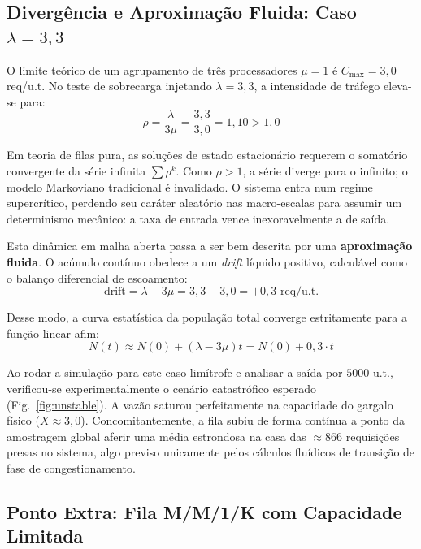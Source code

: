 \documentclass[conference]{IEEEtran}
\begin{document}
\subsection{Divergência e Aproximação Fluida: Caso $\lambda = 3{,}3$}

O limite teórico de um agrupamento de três processadores $\mu=1$ é $C_{\text{max}} = 3{,}0$ req/u.t. No teste de sobrecarga injetando $\lambda = 3{,}3$, a intensidade de tráfego eleva-se para:
\begin{equation}
\rho = \frac{\lambda}{3\mu} = \frac{3{,}3}{3{,}0} = 1{,}10 > 1{,}0
\end{equation}

Em teoria de filas pura, as soluções de estado estacionário requerem o somatório convergente da série infinita $\sum \rho^k$. Como $\rho > 1$, a série diverge para o infinito; o modelo Markoviano tradicional é invalidado. O sistema entra num regime supercrítico, perdendo seu caráter aleatório nas macro-escalas para assumir um determinismo mecânico: a taxa de entrada vence inexoravelmente a de saída.

Esta dinâmica em malha aberta passa a ser bem descrita por uma \textbf{aproximação fluida}. O acúmulo contínuo obedece a um \textit{drift} líquido positivo, calculável como o balanço diferencial de escoamento:
\begin{equation}
\text{drift} = \lambda - 3\mu = 3{,}3 - 3{,}0 = +0{,}3 \text{ req/u.t.}
\end{equation}

Desse modo, a curva estatística da população total converge estritamente para a função linear afim:
\begin{equation}
N(t) \approx N(0) + (\lambda - 3\mu) t = N(0) + 0{,}3 \cdot t
\end{equation}

Ao rodar a simulação para este caso limítrofe e analisar a saída por $5000$ u.t., verificou-se experimentalmente o cenário catastrófico esperado (Fig.~\ref{fig:unstable}). A vazão saturou perfeitamente na capacidade do gargalo físico ($X \approx 3{,}0$). Concomitantemente, a fila subiu de forma contínua a ponto da amostragem global aferir uma média estrondosa na casa das $\approx 866$ requisições presas no sistema, algo previso unicamente pelos cálculos fluídicos de transição de fase de congestionamento.

\subsection{Ponto Extra: Fila M/M/1/K com Capacidade Limitada}
\label{sec:bonus-buffer}
\end{document}
